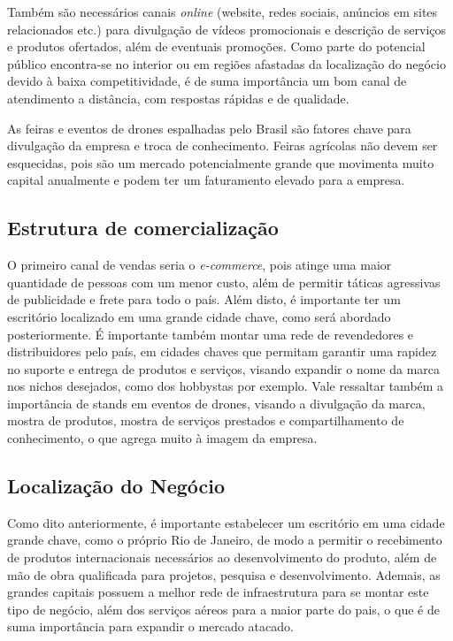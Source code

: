 Também são necessários canais \emph{online} (website, redes sociais, 
anúncios em sites relacionados etc.) para divulgação de vídeos 
promocionais e descrição de serviços e produtos ofertados, além de 
eventuais promoções. Como parte do potencial público encontra-se no 
interior ou em regiões afastadas da localização do negócio devido à baixa 
competitividade, é de suma importância um bom canal de atendimento a 
distância, com respostas rápidas e de qualidade. 

As feiras e eventos de drones espalhadas pelo Brasil são fatores chave para 
divulgação da empresa e troca de conhecimento. Feiras agrícolas não devem 
ser esquecidas, pois são um mercado potencialmente grande que movimenta 
muito capital anualmente e podem ter um faturamento elevado para a empresa. 

\subsection{Estrutura de comercialização}


O primeiro canal de vendas seria o \emph{e-commerce}, pois atinge uma maior quantidade de 
pessoas com um menor custo, além de permitir táticas agressivas de publicidade e frete para todo o 
país. Além disto, é importante ter um escritório localizado em uma grande cidade chave, como 
será abordado posteriormente. É importante também montar uma rede de revendedores e distribuidores 
pelo país, em cidades chaves que permitam garantir uma rapidez no suporte e entrega de produtos 
e serviços, visando expandir o nome da marca nos nichos desejados, como dos hobbystas por exemplo. 
Vale ressaltar também a importância de stands em eventos de drones, visando a divulgação da marca, 
mostra de produtos, mostra de serviços prestados e compartilhamento de conhecimento, o 
que agrega muito à imagem da empresa.

\subsection{Localização do Negócio}


Como dito anteriormente, é importante estabelecer um escritório em uma cidade grande chave, 
como o próprio Rio de Janeiro, de modo a permitir o recebimento de produtos internacionais 
necessários ao desenvolvimento do produto, além de mão de obra qualificada para projetos, 
pesquisa e desenvolvimento. Ademais, as grandes capitais possuem a melhor rede de infraestrutura 
para se montar este tipo de negócio, além dos serviços aéreos para a maior parte do pais, o 
que é de suma importância para expandir o mercado atacado.
